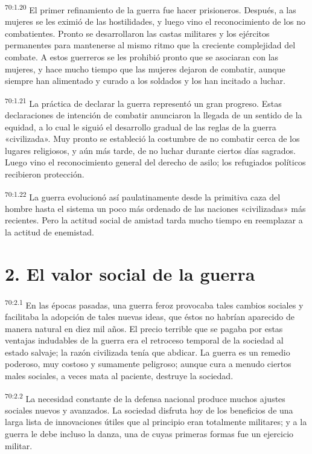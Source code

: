 \par
\textsuperscript{70:1.20} El primer refinamiento de la guerra fue hacer prisioneros. Después, a las mujeres se les eximió de las hostilidades, y luego vino el reconocimiento de los no combatientes. Pronto se desarrollaron las castas militares y los ejércitos permanentes para mantenerse al mismo ritmo que la creciente complejidad del combate. A estos guerreros se les prohibió pronto que se asociaran con las mujeres, y hace mucho tiempo que las mujeres dejaron de combatir, aunque siempre han alimentado y curado a los soldados y los han incitado a luchar.

\par
\textsuperscript{70:1.21} La práctica de declarar la guerra representó un gran progreso. Estas declaraciones de intención de combatir anunciaron la llegada de un sentido de la equidad, a lo cual le siguió el desarrollo gradual de las reglas de la guerra «civilizada». Muy pronto se estableció la costumbre de no combatir cerca de los lugares religiosos, y aún más tarde, de no luchar durante ciertos días sagrados. Luego vino el reconocimiento general del derecho de asilo; los refugiados políticos recibieron protección.

\par
\textsuperscript{70:1.22} La guerra evolucionó así paulatinamente desde la primitiva caza del hombre hasta el sistema un poco más ordenado de las naciones «civilizadas» más recientes. Pero la actitud social de amistad tarda mucho tiempo en reemplazar a la actitud de enemistad.

\section*{2. El valor social de la guerra}
\par
\textsuperscript{70:2.1} En las épocas pasadas, una guerra feroz provocaba tales cambios sociales y facilitaba la adopción de tales nuevas ideas, que éstos no habrían aparecido de manera natural en diez mil años. El precio terrible que se pagaba por estas ventajas indudables de la guerra era el retroceso temporal de la sociedad al estado salvaje; la razón civilizada tenía que abdicar. La guerra es un remedio poderoso, muy costoso y sumamente peligroso; aunque cura a menudo ciertos males sociales, a veces mata al paciente, destruye la sociedad.

\par
\textsuperscript{70:2.2} La necesidad constante de la defensa nacional produce muchos ajustes sociales nuevos y avanzados. La sociedad disfruta hoy de los beneficios de una larga lista de innovaciones útiles que al principio eran totalmente militares; y a la guerra le debe incluso la danza, una de cuyas primeras formas fue un ejercicio militar.

